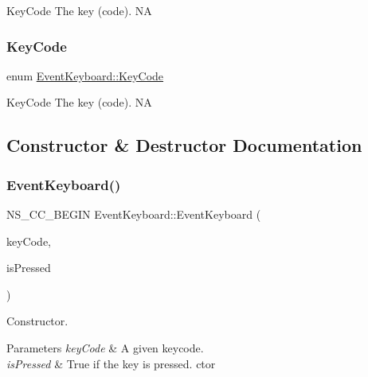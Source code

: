 Key\+Code The key (code).  NA \mbox{\label{classEventKeyboard_a7cd3fa46515673276ce8ec7f0e051606}} 
\subsubsection{\texorpdfstring{Key\+Code}{KeyCode}\hspace{0.1cm}{\footnotesize\ttfamily [2/2]}}
{\footnotesize\ttfamily enum \hyperlink{classEventKeyboard_a7cd3fa46515673276ce8ec7f0e051606}{Event\+Keyboard\+::\+Key\+Code}\hspace{0.3cm}{\ttfamily [strong]}}

Key\+Code The key (code).  NA 

\subsection{Constructor \& Destructor Documentation}
\mbox{\label{classEventKeyboard_ab838fada633a54281037a657a88c0675}} 
\subsubsection{\texorpdfstring{Event\+Keyboard()}{EventKeyboard()}\hspace{0.1cm}{\footnotesize\ttfamily [1/2]}}
{\footnotesize\ttfamily N\+S\+\_\+\+C\+C\+\_\+\+B\+E\+G\+IN Event\+Keyboard\+::\+Event\+Keyboard (\begin{DoxyParamCaption}\item[{\hyperlink{classEventKeyboard_a7cd3fa46515673276ce8ec7f0e051606}{Key\+Code}}]{key\+Code,  }\item[{bool}]{is\+Pressed }\end{DoxyParamCaption})}

Constructor.


\begin{DoxyParams}{Parameters}
{\em key\+Code} & A given keycode. \\
\hline
{\em is\+Pressed} & True if the key is pressed.  ctor \\
\hline
\end{DoxyParams}
\mbox{\label{classEventKeyboard_a15f510c42ff39a6d255bf5732897f90d}} 
